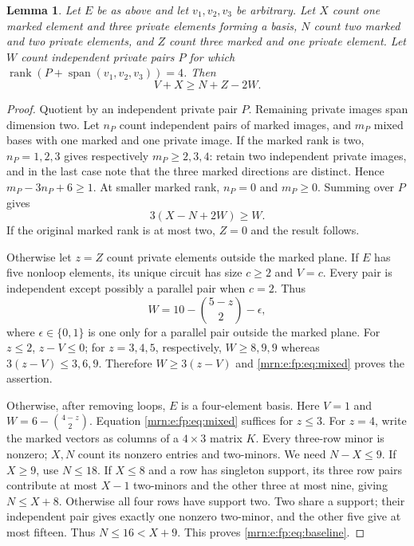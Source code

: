 \documentclass[11pt,a4paper]{article}
\newtheorem{lemma}[theorem]{Lemma}
\theoremstyle{remark}\newtheorem{remark}[theorem]{Remark}
\newcommand{\rk}{\operatorname{rank}}      %
\newcommand{\spn}{\operatorname{span}}     %
\begin{document}
\begin{lemma}\label{mrn:e:fp:lem:baseline}
Let $E$ be as above and let $v_1,v_2,v_3$ be arbitrary. Let $X$ count one marked element and three private elements forming a basis, $N$ count two marked and two private elements, and $Z$ count three marked and one private element. Let $W$ count independent private pairs $P$ for which $\rk(P+\spn(v_1,v_2,v_3))=4$. Then
\begin{equation}\label{mrn:e:fp:eq:baseline}
 V+X\ge N+Z-2W.
\end{equation}
\end{lemma}
\begin{proof}
Quotient by an independent private pair $P$. Remaining private images span dimension two. Let $n_P$ count independent pairs of marked images, and $m_P$ mixed bases with one marked and one private image. If the marked rank is two, $n_P=1,2,3$ gives respectively $m_P\ge2,3,4$: retain two independent private images, and in the last case note that the three marked directions are distinct. Hence $m_P-3n_P+6\ge1$. At smaller marked rank, $n_P=0$ and $m_P\ge0$. Summing over $P$ gives
\begin{equation}\label{mrn:e:fp:eq:mixed}
 3(X-N+2W)\ge W.
\end{equation}
If the original marked rank is at most two, $Z=0$ and the result follows.

Otherwise let $z=Z$ count private elements outside the marked plane. If $E$ has five nonloop elements, its unique circuit has size $c\ge2$ and $V=c$. Every pair is independent except possibly a parallel pair when $c=2$. Thus
\[
 W=10-\binom{5-z}{2}-\epsilon,
\]
where $\epsilon\in\{0,1\}$ is one only for a parallel pair outside the marked plane. For $z\le2$, $z-V\le0$; for $z=3,4,5$, respectively, $W\ge8,9,9$ whereas $3(z-V)\le3,6,9$. Therefore $W\ge3(z-V)$ and \eqref{mrn:e:fp:eq:mixed} proves the assertion.

Otherwise, after removing loops, $E$ is a four-element basis. Here $V=1$ and $W=6-\binom{4-z}{2}$. Equation \eqref{mrn:e:fp:eq:mixed} suffices for $z\le3$. For $z=4$, write the marked vectors as columns of a $4\times3$ matrix $K$. Every three-row minor is nonzero; $X,N$ count its nonzero entries and two-minors. We need $N-X\le9$. If $X\ge9$, use $N\le18$. If $X\le8$ and a row has singleton support, its three row pairs contribute at most $X-1$ two-minors and the other three at most nine, giving $N\le X+8$. Otherwise all four rows have support two. Two share a support; their independent pair gives exactly one nonzero two-minor, and the other five give at most fifteen. Thus $N\le16<X+9$. This proves \eqref{mrn:e:fp:eq:baseline}.
\end{proof}
\end{document}
